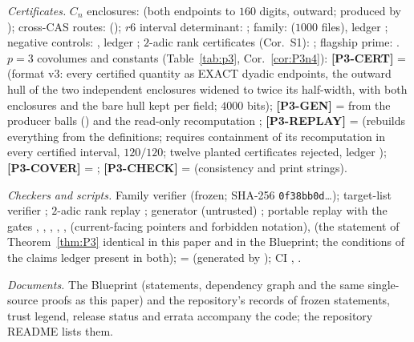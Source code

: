 \documentclass[11pt]{amsart}
\theoremstyle{remark}\newtheorem{remark}[theorem]{Remark}
\theoremstyle{definition}\newtheorem{definition}[theorem]{Definition}
\theoremstyle{definition}\newtheorem{algorithm}[theorem]{Algorithm}
\providecommand{\proofsdir}{../../proofs} %
\begin{document}
\emph{Certificates.} $C_n$ enclosures:  (both endpoints to $160$ digits, outward; produced by ); cross-CAS routes:  (); $r6$ interval determinant: ; family:  ($1000$ files), ledger ; negative controls: , ledger ; $2$-adic rank certificates (Cor.~S1): ; flagship prime: . $p=3$ covolumes and constants (Table~\ref{tab:p3}, Cor.~\ref{cor:P3n4}): \textbf{[P3-CERT]} =  (format v3: every certified quantity as EXACT dyadic endpoints, the outward hull of the two independent enclosures widened to twice its half-width, with both enclosures and the bare hull kept per field; $4000$ bits); \textbf{[P3-GEN]} =  from the producer balls  () and the read-only recomputation ; \textbf{[P3-REPLAY]} =  (rebuilds everything from the definitions; requires containment of its recomputation in every certified interval, $120/120$; twelve planted certificates rejected, ledger ); \textbf{[P3-COVER]} = ; \textbf{[P3-CHECK]} =  (consistency and print strings).

\emph{Checkers and scripts.} Family verifier  (frozen; SHA-256 \texttt{0f38bb0d}\ldots); target-list verifier ; $2$-adic rank replay ; generator (untrusted) ; portable replay  with the gates , , , , ,  (current-facing pointers and forbidden notation),  (the statement of Theorem~\ref{thm:P3} identical in this paper and in the Blueprint; the conditions of the claims ledger present in both); \artNovelty{} =  (generated by ); CI , .

\emph{Documents.} The Blueprint (statements, dependency graph and the same single-source proofs as this paper) and the repository's records of frozen statements, trust legend, release status and errata accompany the code; the repository README lists them.

\end{document}
